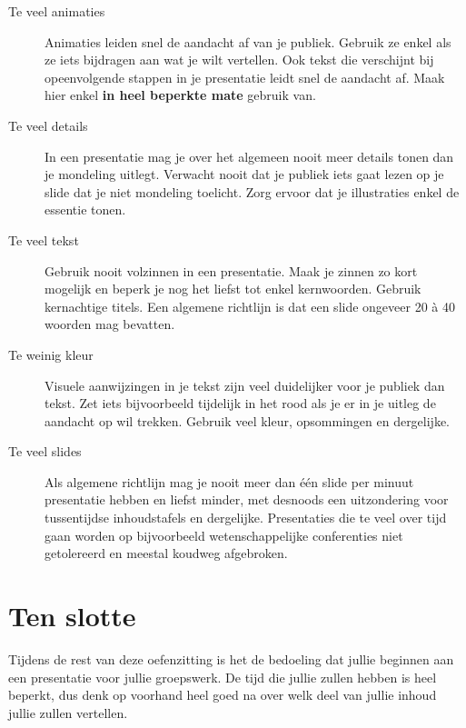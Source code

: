 \documentclass[a4paper,12pt]{article}
\begin{document}
\begin{description}
  \item[Te veel animaties] Animaties leiden snel de aandacht af van je
        publiek. Gebruik ze enkel als ze iets bijdragen aan wat je wilt
        vertellen. Ook tekst die verschijnt bij opeenvolgende stappen in je
        presentatie leidt snel de aandacht af. Maak hier enkel \textbf{in
          heel beperkte mate} gebruik van.
  \item[Te veel details] In een presentatie mag je over het algemeen
        nooit meer details tonen dan je mondeling uitlegt. Verwacht nooit
        dat je publiek iets gaat lezen op je slide dat je niet mondeling
        toelicht. Zorg ervoor dat je illustraties enkel de essentie tonen.
  \item[Te veel tekst] Gebruik nooit volzinnen in een presentatie. Maak
        je zinnen zo kort mogelijk en beperk je nog het liefst tot enkel
        kernwoorden. Gebruik kernachtige titels. Een algemene richtlijn is
        dat een slide ongeveer 20 \`a 40 woorden mag bevatten.
  \item[Te weinig kleur] Visuele aanwijzingen in je tekst zijn veel
        duidelijker voor je publiek dan tekst. Zet iets bijvoorbeeld
        tijdelijk in het rood als je er in je uitleg de aandacht op wil
        trekken. Gebruik veel kleur, opsommingen en dergelijke.
  \item[Te veel slides] Als algemene richtlijn mag je nooit meer dan
        \'e\'en slide per minuut presentatie hebben en liefst minder, met
        desnoods een uitzondering voor tussentijdse inhoudstafels en dergelijke.
        Presentaties die te veel over tijd gaan worden op bijvoorbeeld
        wetenschappelijke conferenties niet getolereerd en meestal koudweg
        afgebroken.
\end{description}

\section{Ten slotte}
Tijdens de rest van deze oefenzitting is het de bedoeling dat jullie
beginnen aan een presentatie voor jullie groepswerk. De tijd die
jullie zullen hebben is heel beperkt, dus denk op voorhand heel goed
na over welk deel van jullie inhoud jullie zullen vertellen.


\flushright

\end{document}
